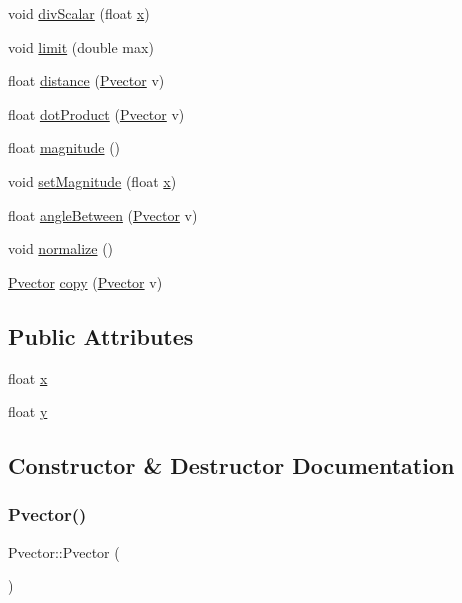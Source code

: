 \begin{DoxyCompactItemize}
\item 
void \hyperlink{class_pvector_a3d60b718b1d2434e52e45a83ea568baf}{div\+Scalar} (float \hyperlink{class_pvector_a7ba0ffff299fbf5e127d1849a9c5c87a}{x})
\item 
void \hyperlink{class_pvector_a2c31c0b80bab261fe888395f781328f1}{limit} (double max)
\item 
float \hyperlink{class_pvector_ad756657de9657b79cf6889ca3161c64e}{distance} (\hyperlink{class_pvector}{Pvector} v)
\item 
float \hyperlink{class_pvector_a4eecd15faddd549f3d99002c42b846e9}{dot\+Product} (\hyperlink{class_pvector}{Pvector} v)
\item 
float \hyperlink{class_pvector_a1aa0154d1d3c92a596610fa366fcfe6c}{magnitude} ()
\item 
void \hyperlink{class_pvector_a72261b3f2e1fc1851202f9a96abd8dc1}{set\+Magnitude} (float \hyperlink{class_pvector_a7ba0ffff299fbf5e127d1849a9c5c87a}{x})
\item 
float \hyperlink{class_pvector_a7c57bb4e92a54b9d3ebb7f2c4c13743f}{angle\+Between} (\hyperlink{class_pvector}{Pvector} v)
\item 
void \hyperlink{class_pvector_af21ee637474eff3c3387a7b7d138004a}{normalize} ()
\item 
\hyperlink{class_pvector}{Pvector} \hyperlink{class_pvector_af5e109a5f1261c4ee69b6f213d7d6154}{copy} (\hyperlink{class_pvector}{Pvector} v)
\end{DoxyCompactItemize}
\subsection*{Public Attributes}
\begin{DoxyCompactItemize}
\item 
float \hyperlink{class_pvector_a7ba0ffff299fbf5e127d1849a9c5c87a}{x}
\item 
float \hyperlink{class_pvector_ab9d5ab87022aa781382b8eb4b944b375}{y}
\end{DoxyCompactItemize}


\subsection{Constructor \& Destructor Documentation}
\mbox{\label{class_pvector_adbfc55ed132fa66b441510d2f6c74cb5}} 
\subsubsection{\texorpdfstring{Pvector()}{Pvector()}\hspace{0.1cm}{\footnotesize\ttfamily [1/2]}}
{\footnotesize\ttfamily Pvector\+::\+Pvector (\begin{DoxyParamCaption}{ }\end{DoxyParamCaption})\hspace{0.3cm}{\ttfamily [inline]}}


